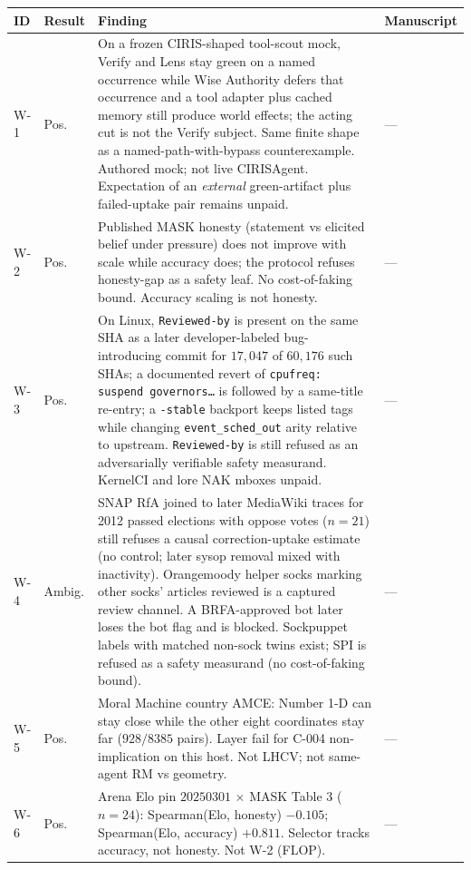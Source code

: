 \begin{longtable}{@{}L{0.05\textwidth}L{0.08\textwidth}L{0.55\textwidth}L{0.255\textwidth}@{}}
\toprule
\textbf{ID} & \textbf{Result} & \textbf{Finding} & \textbf{Manuscript} \\
\midrule
\endhead
\bottomrule
\endfoot
\label{finding:w-1}W-1 & Pos. & On a frozen CIRIS-shaped tool-scout mock, Verify and Lens stay green on a named occurrence while Wise Authority defers that occurrence and a tool adapter plus cached memory still produce world effects; the acting cut is not the Verify subject. Same finite shape as a named-path-with-bypass counterexample. Authored mock; not live CIRISAgent. Expectation of an \emph{external} green-artifact plus failed-uptake pair remains unpaid. & --- \\
\label{finding:w-2}W-2 & Pos. & Published MASK honesty (statement vs elicited belief under pressure) does not improve with scale while accuracy does; the protocol refuses honesty-gap as a safety leaf. No cost-of-faking bound. Accuracy scaling is not honesty. & --- \\
\label{finding:w-3}W-3 & Pos. & On Linux, \texttt{Reviewed-by} is present on the same SHA as a later developer-labeled bug-introducing commit for $17{,}047$ of $60{,}176$ such SHAs; a documented revert of \texttt{cpufreq: suspend governors\ldots} is followed by a same-title re-entry; a \texttt{-stable} backport keeps listed tags while changing \texttt{event\_sched\_out} arity relative to upstream. \texttt{Reviewed-by} is still refused as an adversarially verifiable safety measurand. KernelCI and lore NAK mboxes unpaid. & --- \\
\label{finding:w-4}W-4 & Ambig. & SNAP RfA joined to later MediaWiki traces for 2012 passed elections with oppose votes ($n=21$) still refuses a causal correction-uptake estimate (no control; later sysop removal mixed with inactivity). Orangemoody helper socks marking other socks' articles reviewed is a captured review channel. A BRFA-approved bot later loses the bot flag and is blocked. Sockpuppet labels with matched non-sock twins exist; SPI is refused as a safety measurand (no cost-of-faking bound). & --- \\
\label{finding:w-5}W-5 & Pos. & Moral Machine country AMCE: Number 1-D can stay close while the other eight coordinates stay far ($928/8385$ pairs). Layer fail for C-004 non-implication on this host. Not LHCV; not same-agent RM vs geometry. & --- \\
\label{finding:w-6}W-6 & Pos. & Arena Elo pin $20250301$ $\times$ MASK Table 3 ($n=24$): Spearman(Elo, honesty) $-0.105$; Spearman(Elo, accuracy) $+0.811$. Selector tracks accuracy, not honesty. Not W-2 (FLOP). & --- \\

\end{longtable}
